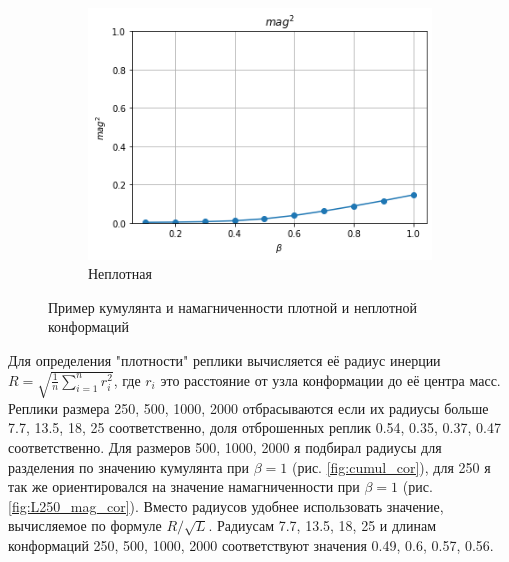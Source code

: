 \begin{figure}[h]
\begin{subfigure}[t]{0.48\textwidth}
		\includegraphics[width=\textwidth]{../images/loose_magnetization.png} 
		\caption{Неплотная}
	\end{subfigure}
	\caption{Пример кумулянта и намагниченности плотной и неплотной конформаций}
\end{figure}


Для определения "плотности" реплики вычисляется её радиус инерции $R = \sqrt{\frac{1}{n}\sum_{i=1}^{n}r_{i}^{2}}$, где $r_i$ это расстояние от узла конформации до её центра масс. Реплики размера 250, 500, 1000, 2000 отбрасываются если их радиусы больше 7.7, 13.5, 18, 25 соответственно, доля отброшенных реплик 0.54, 0.35, 0.37, 0.47 соответственно. Для размеров 500, 1000, 2000 я подбирал радиусы для разделения по значению кумулянта при $\beta = 1$ (рис. \ref{fig:cumul_cor}), для 250 я так же ориентировался на значение намагниченности при $\beta = 1$ (рис. \ref{fig:L250_mag_cor}). Вместо радиусов удобнее использовать значение, вычисляемое по формуле $R/\sqrt{L}$. Радиусам 7.7, 13.5, 18, 25 и длинам конформаций 250, 500, 1000, 2000 соответствуют значения 0.49, 0.6, 0.57, 0.56.

